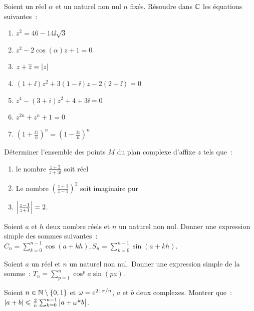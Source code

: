 \begin{exercice}
    Soient un réel \(\alpha\) et un naturel non nul \(n\) fixés. Résoudre dans 
    \(\mathbb{C}\) les équations suivantes~:
    \begin{multicols}{2}
        \begin{enumerate}
            \item \(z^2 = 46-14\ii\sqrt{3}\)
            \item \(z^2-2\cos(\alpha)z + 1 = 0\)
            \item \(z + \overline{z} = \left\lvert z\right\rvert\)
            \item \((1 + \ii)z^2 + 3(1-\ii)z-2(2 + \ii) = 0\)
            \item \(z^4-(3 + i)z^2 + 4 + 3\ii = 0\)
            \item \(z^{2n} + z^n + 1 = 0\)
            \item \(\left(1 + \frac{\ii z}{n}\right)^n = \left(1-\frac{\ii 
                z}{n}\right)^n\)
        \end{enumerate}
    \end{multicols}
\end{exercice}

\begin{exercice}
    Déterminer l'ensemble des points \(M\) du plan complexe d'affixe \(z\) tels 
    que~:
    \begin{enumerate}
        \item le nombre \(\frac{z + 2}{z + 3\ii}\) soit réel
        \item Le nombre \(\left(\frac{z + 1}{z-1}\right)^2\) soit imaginaire pur
        \item \(\left\lvert\frac{z-1}{z + 1}\right\rvert = 2\).
    \end{enumerate}
\end{exercice}

\begin{exercice}
    Soient \(a\) et \(h\) deux nombre réels et \(n\) un naturel non nul. Donner 
    une expression simple des sommes suivantes~: \( C_n = \sum_{k = 0}^{n-1} 
    \cos(a + kh), S_n = \sum_{k = 0}^{n-1} \sin(a + kh)\).
\end{exercice}

\begin{exercice}
    Soient \(a\) un réel et \(n\) un naturel non nul. Donner une expression 
    simple de la somme~: \(T_n = \sum_{p = 1}^n \cos^p a \sin(pa)\).
\end{exercice}

\begin{exercice}
    Soient \(n \in \mathbb{N}\setminus\{0,1\}\) et \(\omega = \operatorname{e}^{2\operatorname{i}\pi/n}\), \(a\) et 
    \(b\) deux complexes. Montrer que~: \(\left\lvert a + b\right\rvert \leqslant \frac{2}{n} 
    \sum_{k = 0}^{n-1} \left\lvert a + \omega^k b\right\rvert\).
\end{exercice}


